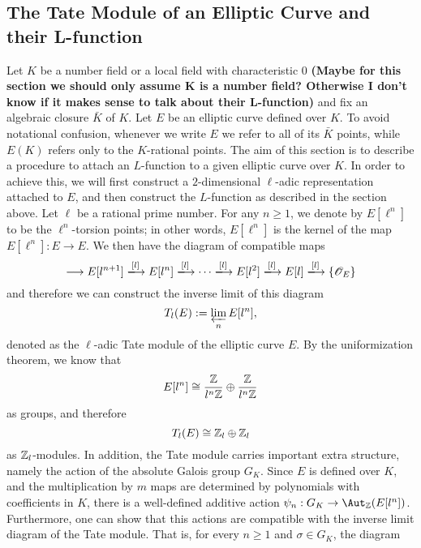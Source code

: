\subsection{The Tate Module of an Elliptic Curve and their L-function}
Let $K$ be a number field or a local field with characteristic $0$ \textbf{(Maybe for this section we should only assume K is a number field? Otherwise I don't know if it makes sense to talk about their L-function)} and fix an algebraic closure $\bar{K}$ of $K$. Let $E$ be an elliptic curve defined over $K$. To avoid notational confusion, whenever we write $E$ we refer to all of its $\bar{K}$ points, while $E(K)$ refers only to the $K$-rational points. The aim of this section is to describe a procedure to attach an $L$-function to a given elliptic curve over $K$. In order to achieve this, we will first construct a $2$-dimensional $\ell$-adic representation attached to $E$, and then construct the $L$-function as described in the section above.
Let $\ell$ be a rational prime number. For any $n\geq1$, we denote by $E[\ell^n]$ to be the $\ell^n$-torsion points; in other words, $E[\ell^n]$ is the kernel of the map $E[\ell^n]:E\to E$. We then have the diagram of compatible maps
\[
    \longrightarrow E[\ell^{n+1}]\xlongrightarrow{[\ell]} E[\ell^{n}]\xlongrightarrow{[\ell]}\cdots\xlongrightarrow{[\ell]} E[\ell^2]\xlongrightarrow{[\ell]} E[\ell]\xlongrightarrow{[\ell]} \{\mathcal{O}_E\} 
\] 
and therefore we can construct the inverse limit of this diagram
$$T_\ell(E):=\varprojlim_{n}E[\ell^n],$$
denoted as the $\ell$-adic Tate module of the elliptic curve $E$. By the uniformization theorem, we know that 
$$E[\ell^n]\cong\frac{\ZZ}{\ell^n\ZZ}\oplus\frac{\ZZ}{\ell^n\ZZ}$$
as groups, and therefore 
$$T_\ell(E)\cong\ZZ_\ell\oplus\ZZ_\ell$$
as $\ZZ_\ell$-modules. In addition, the Tate module carries important extra structure, namely the action of the absolute Galois group $G_K$. Since $E$ is defined over $K$, and the multiplication by $m$ maps are determined by polynomials with coefficients in $K$, there is a well-defined additive action $\psi_n:G_K\rightarrow\Aut_{\ZZ}(E[\ell^n])$. Furthermore, one can show that this actions are compatible with the inverse limit diagram of the Tate module. That is, for every $n\geq 1$ and $\sigma\in G_K$, the diagram


\begin{center}
\end{center}

